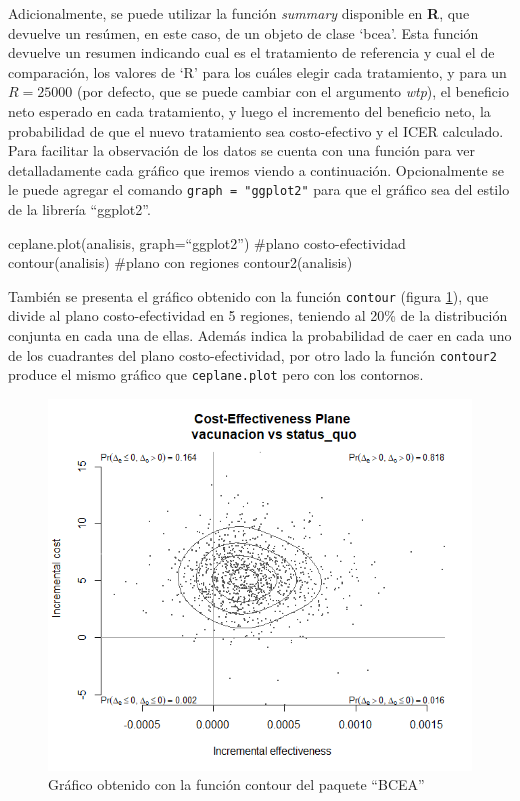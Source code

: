 \documentclass[12pt]{article}
\begin{document}
Adicionalmente, se puede utilizar la función \textit{summary} disponible en \textbf{R}, que devuelve un resúmen, en este caso, de un objeto de clase `bcea'. Esta función devuelve un resumen indicando cual es el tratamiento de referencia y cual el de comparación, los valores de `R' para los cuáles elegir cada tratamiento, y para un $R=25000$ (por defecto, que se puede cambiar con el argumento \textit{wtp}), el beneficio neto esperado en cada tratamiento, y luego el incremento del beneficio neto, la probabilidad de que el nuevo tratamiento sea costo-efectivo y el ICER calculado.\\

Para facilitar la observación de los datos se cuenta con una función para ver detalladamente cada gráfico que iremos viendo a continuación. Opcionalmente se le puede agregar el comando \texttt{graph = "ggplot2"} para que el gráfico sea del estilo de la librería ``ggplot2''.\

\begin{Rcode}
ceplane.plot(analisis, graph=``ggplot2'')  #plano costo-efectividad
contour(analisis)  #plano con regiones
contour2(analisis)
\end{Rcode}

También se presenta el gráfico obtenido con la función \texttt{contour} (figura \ref{fig:64}), que divide al plano costo-efectividad en 5 regiones, teniendo al 20\% de la distribución conjunta en cada una de ellas. Además indica la probabilidad de caer en cada uno de los cuadrantes del plano costo-efectividad, por otro lado la función \texttt{contour2} produce el mismo gráfico que \texttt{ceplane.plot} pero con los contornos.


\begin{figure}[H]
    \centering
    \includegraphics[width=.65 \textwidth]{grafi/countor_plot.jpg}
    \caption{Gráfico obtenido con la función contour del paquete ``BCEA''}
    \label{fig:64}
\end{figure}
\end{document}
